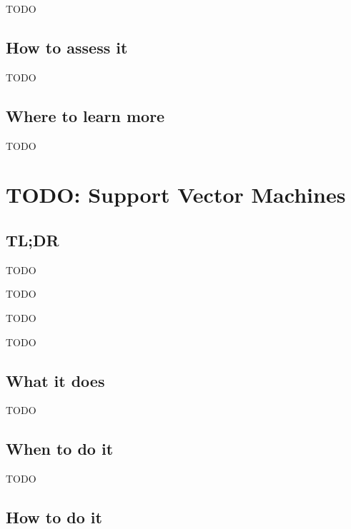 \documentclass[
]{book}
\providecommand{\tightlist}{%
  \setlength{\itemsep}{0pt}\setlength{\parskip}{0pt}}
\begin{document}
TODO

\hypertarget{how-to-assess-it-19}{%
\section{How to assess it}\label{how-to-assess-it-19}}

TODO

\hypertarget{where-to-learn-more-19}{%
\section{Where to learn more}\label{where-to-learn-more-19}}

TODO

\hypertarget{support-vector-machines}{%
\chapter{TODO: Support Vector Machines}\label{support-vector-machines}}

\hypertarget{tldr-20}{%
\section{TL;DR}\label{tldr-20}}

\begin{description}
\tightlist
\item[What it does]
TODO
\item[When to do it]
TODO
\item[How to do it]
TODO
\item[How to assess it]
TODO
\end{description}

\hypertarget{what-it-does-20}{%
\section{What it does}\label{what-it-does-20}}

TODO

\hypertarget{when-to-do-it-20}{%
\section{When to do it}\label{when-to-do-it-20}}

TODO

\hypertarget{how-to-do-it-20}{%
\section{How to do it}\label{how-to-do-it-20}}
\end{document}
